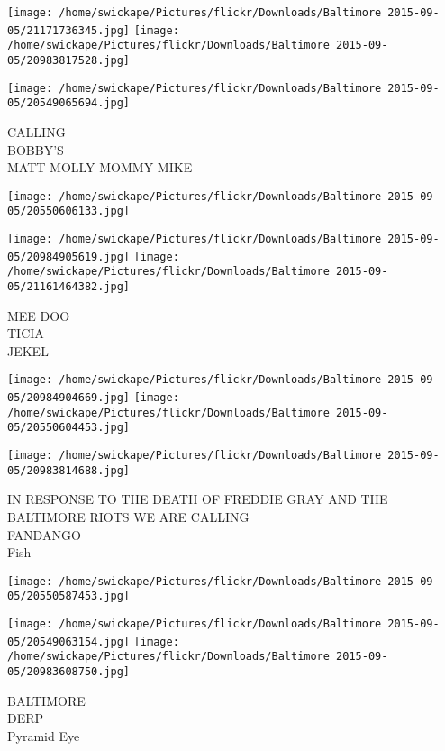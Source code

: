 \documentclass[10pt,letterpaper]{article}
\begin{document}
\texttt{[image: /home/swickape/Pictures/flickr/Downloads/Baltimore 2015-09-05/21171736345.jpg]}
\texttt{[image: /home/swickape/Pictures/flickr/Downloads/Baltimore 2015-09-05/20983817528.jpg]}

\texttt{[image: /home/swickape/Pictures/flickr/Downloads/Baltimore 2015-09-05/20549065694.jpg]}

CALLING\\
BOBBY'S\\
MATT MOLLY MOMMY MIKE\\
\pagebreak

\texttt{[image: /home/swickape/Pictures/flickr/Downloads/Baltimore 2015-09-05/20550606133.jpg]}

\vspace{0.25in}
\texttt{[image: /home/swickape/Pictures/flickr/Downloads/Baltimore 2015-09-05/20984905619.jpg]}
\texttt{[image: /home/swickape/Pictures/flickr/Downloads/Baltimore 2015-09-05/21161464382.jpg]}

MEE DOO\\
TICIA\\
JEKEL\\
\pagebreak

\texttt{[image: /home/swickape/Pictures/flickr/Downloads/Baltimore 2015-09-05/20984904669.jpg]}
\texttt{[image: /home/swickape/Pictures/flickr/Downloads/Baltimore 2015-09-05/20550604453.jpg]}

\vspace{0.25in}
\texttt{[image: /home/swickape/Pictures/flickr/Downloads/Baltimore 2015-09-05/20983814688.jpg]}

IN RESPONSE TO THE DEATH OF FREDDIE GRAY AND THE BALTIMORE RIOTS WE ARE CALLING\\
FANDANGO\\
Fish\\
\pagebreak

\texttt{[image: /home/swickape/Pictures/flickr/Downloads/Baltimore 2015-09-05/20550587453.jpg]}

\vspace{0.25in}
\texttt{[image: /home/swickape/Pictures/flickr/Downloads/Baltimore 2015-09-05/20549063154.jpg]}
\texttt{[image: /home/swickape/Pictures/flickr/Downloads/Baltimore 2015-09-05/20983608750.jpg]}

BALTIMORE\\
DERP\\
Pyramid Eye\\
\pagebreak
\end{document}
